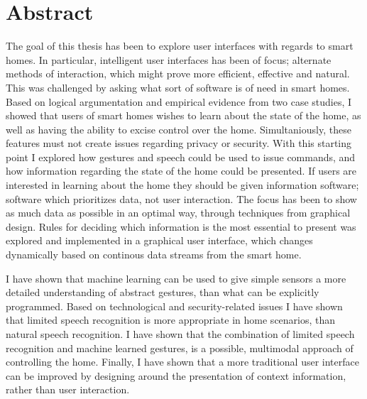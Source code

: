 \section*{Abstract}
The goal of this thesis has been to explore user interfaces with regards to smart homes. In particular, intelligent user interfaces has been of focus; alternate methods of interaction, which might prove more efficient, effective and natural. This was challenged by asking what sort of software is of need in smart homes. Based on logical argumentation and empirical evidence from two case studies, I showed that users of smart homes wishes to learn about the state of the home, as well as having the ability to excise control over the home. Simultaniously, these features must not create issues regarding privacy or security. With this starting point I explored how gestures and speech could be used to issue commands, and how information regarding the state of the home could be presented. If users are interested in learning about the home they should be given information software; software which prioritizes data, not user interaction. The focus has been to show as much data as possible in an optimal way, through techniques from graphical design. Rules for deciding which information is the most essential to present was explored and implemented in a graphical user interface, which changes dynamically based on continous data streams from the smart home.

I have shown that machine learning can be used to give simple sensors a more detailed understanding of abstract gestures, than what can be explicitly programmed. Based on technological and security-related issues I have shown that limited speech recognition is more appropriate in home scenarios, than natural speech recognition. I have shown that the combination of limited speech recognition and machine learned gestures, is a possible, multimodal approach of controlling the home. Finally, I have shown that a more traditional user interface can be improved by designing around the presentation of context information, rather than user interaction.